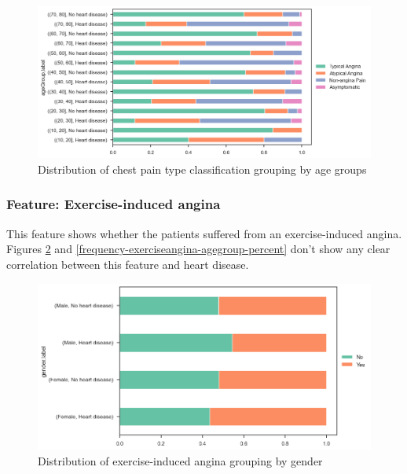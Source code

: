 \begin{figure}[H]
    \caption{Distribution of chest pain type classification grouping by age groups}\label{frequency-paintype-agegroup-percent}
    \centering
    \includegraphics[width=\linewidth]{media/frequency-10-agegroup-paintype.png}
\end{figure}

\subsubsection{Feature: Exercise-induced angina}

This feature shows whether the patients suffered from an exercise-induced angina. Figures \ref{frequency-exerciseangina-gender-percent}
and \ref{frequency-exerciseangina-agegroup-percent} don't show any clear correlation between this feature
and heart disease.

\begin{figure}[H]
    \caption{Distribution of exercise-induced angina grouping by gender}\label{frequency-exerciseangina-gender-percent}
    \centering
    \includegraphics[width=\linewidth]{media/frequency-11-gender-exerciseangina.png}
\end{figure}

